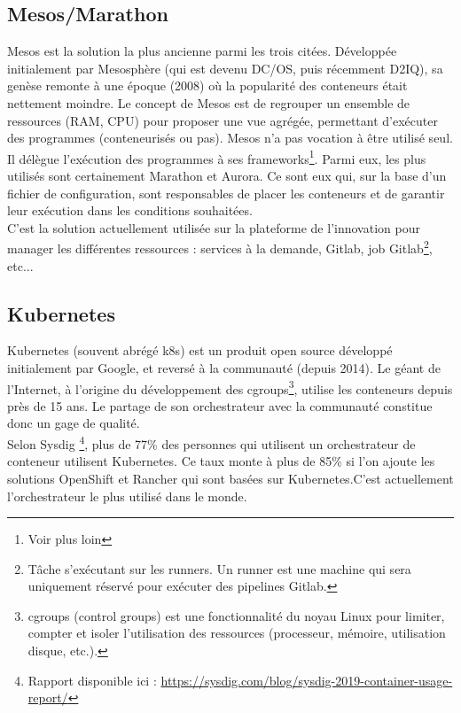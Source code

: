 \documentclass[11pt,fleqn]{book} %
\begin{document}
\subsection{Mesos/Marathon}
Mesos est la solution la plus ancienne parmi les trois citées. Développée initialement par Mesosphère (qui est devenu DC/OS, puis récemment D2IQ), sa genèse remonte à une époque (2008) où la popularité des conteneurs était nettement moindre. Le concept de Mesos est de regrouper un ensemble de ressources (RAM, CPU) pour proposer une vue agrégée, permettant d’exécuter des programmes (conteneurisés ou pas). Mesos n’a pas vocation à être utilisé seul. Il délègue l’exécution des programmes à ses frameworks\footnote{Voir plus loin}. Parmi eux, les plus utilisés sont certainement Marathon et Aurora. Ce sont eux qui, sur la base d’un fichier de configuration, sont responsables de placer les conteneurs et de garantir leur exécution dans les conditions souhaitées.\\

C'est la solution actuellement utilisée sur la plateforme de l'innovation pour manager les différentes ressources : services à la demande, Gitlab, job Gitlab\footnote{Tâche s'exécutant sur les runners. Un runner est une machine qui sera uniquement réservé pour exécuter des pipelines Gitlab.}, etc... \\ 

\subsection{Kubernetes}
Kubernetes (souvent abrégé k8s) est un produit open source développé initialement par Google, et reversé à la communauté (depuis 2014). Le géant de l’Internet, à l’origine du développement des cgroups\footnote{cgroups (control groups) est une fonctionnalité du noyau Linux pour limiter, compter et isoler l'utilisation des ressources (processeur, mémoire, utilisation disque, etc.).}, utilise les conteneurs depuis près de 15 ans. Le partage de son orchestrateur avec la communauté constitue donc un gage de qualité. \\

Selon Sysdig \footnote{ Rapport disponible ici : \url{https://sysdig.com/blog/sysdig-2019-container-usage-report/}}, plus de 77\% des personnes qui utilisent un orchestrateur de conteneur utilisent Kubernetes. Ce taux monte à plus de 85\% si l'on ajoute les solutions OpenShift et Rancher qui sont basées sur Kubernetes.C'est actuellement l'orchestrateur le plus utilisé dans le monde.\\ 
\end{document}
